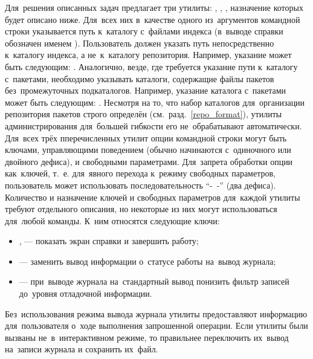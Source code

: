 Для~решения описанных задач \ds предлагает три утилиты:
,
,
,
назначение которых будет описано ниже.
Для~всех них в~качестве одного из~аргументов командной строки указывается путь к~каталогу с~файлами индекса (в~выводе справки обозначен именем ).
Пользователь должен указать путь непосредственно к~каталогу индекса,
а не~к~каталогу репозитория. 
Например, указание может быть следующим: . 
Аналогично, везде, где требуется указание пути к~каталогу с~пакетами, необходимо указывать каталоги,
содержащие файлы пакетов без~промежуточных подкаталогов.
Например, указание каталога с~пакетами может быть следующим: .
Несмотря на то, что набор каталогов для~организации репозитория пакетов \ds строго определён (см.~разд.~\ref{repo_format}),
утилиты администрирования  для~большей гибкости его не~обрабатывают автоматически.
Для~всех трёх пперечисленных утилит опции командной строки могут быть ключами, управляющими поведением (обычно начинаются с~одиночного или двойного дефиса), и свободными параметрами.
Для~запрета обработки опции как~ключей, т.~е. для~явного перехода к~режиму свободных параметров,
 пользователь может использовать последовательность ``-~-'' (два дефиса). %
Количество и назначение ключей и свободных параметров для~каждой утилиты требуют отдельного   описания,
но некоторые из них могут использоваться для~любой команды. 
К~ним относятся следующие ключи:

\begin{itemize}

\item {
,  --- показать экран справки и завершить работу; %
}

\item {
 --- заменить вывод информации о~статусе работы на~вывод журнала; %
}

\item {
 --- при~выводе журнала  на~стандартный вывод понизить фильтр записей до~уровня отладочной информации. %
}

\end{itemize}

Без~использования режима вывода журнала утилиты предоставляют информацию для~пользователя о~ходе выполнения запрошенной операции.
Если утилиты были вызваны не~в~интерактивном режиме, то правильнее переключить их~вывод на~записи журнала и сохранить их~файл. 

